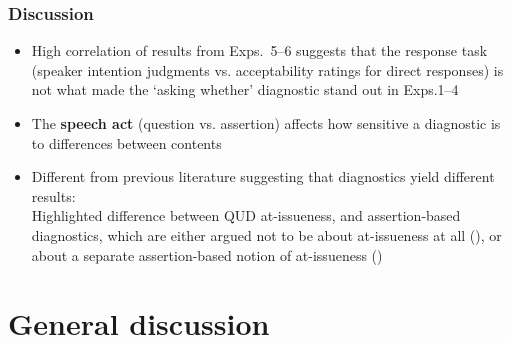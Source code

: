 \documentclass[compress, xcolor = dvipsnames, aspectratio=169]{beamer}
\begin{document}
	\begin{frame}\frametitle{Discussion}
		
		\begin{itemize}[<+->]
			\item High correlation of results from Exps.~5–6 suggests that the response task (speaker intention judgments vs. acceptability ratings for direct responses) is not what made the `asking whether' diagnostic stand out in Exps.1–4

			\item The \textbf{speech act} (question vs. assertion) affects how sensitive a diagnostic is to differences between contents
			\item Different from previous literature suggesting that diagnostics yield different results:\\
			Highlighted difference between QUD at-issueness, and assertion-based diagnostics, which are either argued not to be about at-issueness at all
			(\citealt{snider_anaphoric_2017,snider_at-issuenessne_2017,snider_distinguishing_2018}), or about a separate assertion-based notion of at-issueness (\citealt{koev_notions_2018,faller_discourse_2019,korotkova_evidential_2020})
		\end{itemize} 

	\end{frame}	

\section{General discussion}
\end{document}
